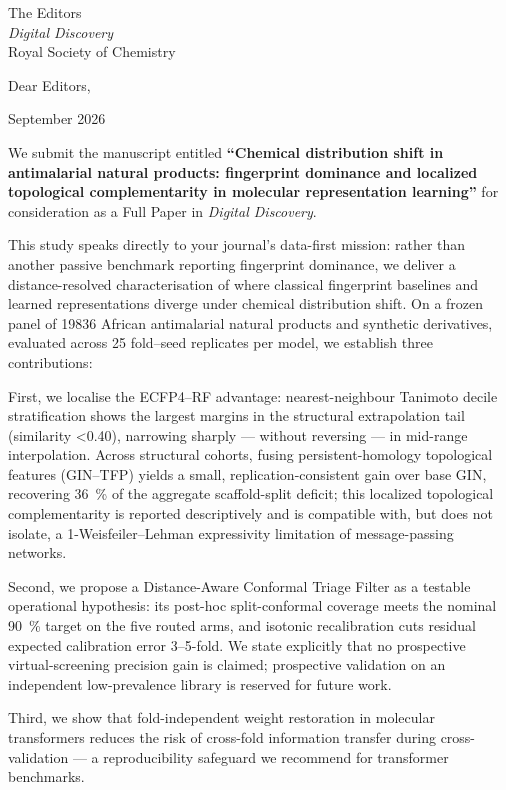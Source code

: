 \documentclass[11pt,a4paper]{letter}
\begin{document}
\begin{letter}{%
  The Editors \\
  \textit{Digital Discovery} \\
  Royal Society of Chemistry
}

\opening{Dear Editors,}

 September 2026

We submit the manuscript entitled \textbf{``Chemical distribution shift in antimalarial natural products: fingerprint dominance and localized topological complementarity in molecular representation learning''} for consideration as a Full Paper in \textit{Digital Discovery}.

This study speaks directly to your journal's data-first mission: rather than another passive benchmark reporting fingerprint dominance, we deliver a distance-resolved characterisation of where classical fingerprint baselines and learned representations diverge under chemical distribution shift. On a frozen panel of \num{19836} African antimalarial natural products and synthetic derivatives, evaluated across \num{25} fold--seed replicates per model, we establish three contributions:

First, we localise the ECFP4--RF advantage: nearest-neighbour Tanimoto decile stratification shows the largest margins in the structural extrapolation tail (similarity \num{<0.40}), narrowing sharply --- without reversing --- in mid-range interpolation. Across structural cohorts, fusing persistent-homology topological features (GIN--TFP) yields a small, replication-consistent gain over base GIN, recovering \qty{36}{\percent} of the aggregate scaffold-split deficit; this localized topological complementarity is reported descriptively and is compatible with, but does not isolate, a 1-Weisfeiler--Lehman expressivity limitation of message-passing networks.

Second, we propose a Distance-Aware Conformal Triage Filter as a testable operational hypothesis: its post-hoc split-conformal coverage meets the nominal \qty{90}{\percent} target on the five routed arms, and isotonic recalibration cuts residual expected calibration error \numrange{3}{5}-fold. We state explicitly that no prospective virtual-screening precision gain is claimed; prospective validation on an independent low-prevalence library is reserved for future work.

Third, we show that fold-independent weight restoration in molecular transformers reduces the risk of cross-fold information transfer during cross-validation --- a reproducibility safeguard we recommend for transformer benchmarks.


\end{letter}
\end{document}

